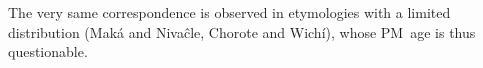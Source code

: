 \begin{exe}
    \ex \gofirst
    \ex \goawayi
    \ex \arrive
    \ex \shout
    \ex \stinger
    \ex \cryao
    \ex \returnth
    \ex \burn
    \ex \food
    \ex \son
    \ex \daughter
    \ex \bleedv
    \ex \drinkn
    \ex \fatv
    \ex \flyv
    \ex \suncho
    \ex \welln
    \ex \drinkv
    \ex \jaguar
    \ex \treen
    \ex \water
    \ex \vulture
    \ex \truev
    \ex \testicle
    \ex \tail
    \ex \fall
    \ex \cactus \label{ao-cactus}
    \ex \arrowkaxe
    \ex \youngersis
    \ex \withstand
    \ex \killv
    \ex \snail
    \ex \pet
    \ex \nightmonkey
    \ex {} \label{ao-defecate}
    \ex \lightfire
    \ex \sleep
    \ex \goimp
    \ex \powder \label{ao-powder}
    \ex \father
    \ex \rope
    \ex \pathn
    \ex \cavy
    \ex \snore
    \ex \mucus
    \ex \bitter \label{ao-bitter}
    \ex \lip
    \ex \shuck
    \ex \jabiru
    \ex \quick
    \ex \up
    \ex \leg
    \ex \fishwithhook
    \ex \soul \label{ao-soul}
    \ex \vein
    \ex \spank
    \ex \wildcat
    \ex \acquainted
    \ex \sprout
    \ex \dinlaw
    \ex \eyelash \label{ao-eyelash}
    \ex \shoot
    \ex \carrysh \label{ao-carrysh}
    \ex \woodpecker
    \ex \chaja
    \ex \tired
    \ex \badmood
    \ex \rhea \label{ao-rhea}
    \ex \butterfly
    \ex \bat \label{ao-bat}
    \ex \straw
    \ex \rat \label{ao-rat}
    \ex \wildhoney
    \ex \mistolf
    \ex \mistolt
    \ex \hurt
    \ex \chaguara
    \ex \argentineboa \label{ao-argentineboa}
    \ex \wildbean \label{ao-wildbean}
    \ex \waspaniti
    \ex \stepv
    \ex \wildpepper
    \ex \skin
    \ex \teach \label{ao-teach}
    \ex \firei
    \ex \doveula
\end{exe}

The very same correspondence is observed in etymologies with a limited distribution (Maká and Nivaĉle, Chorote and Wichí), whose PM~age is thus questionable.

\begin{exe}
    \ex \pronominal \label{ao-pronominal}
    \ex \wordamet
    \ex \spin
    \ex \jar
    \ex \spillmn
    \ex \pocote
    \ex \tobacco
    \ex \ocelot
    \ex \redv
    \ex \torn
    \ex \grandchild
    \ex \feel
    \ex \willow
    \ex \two
    \ex \frog
    \ex \gutscw
    \ex \cicada
    \ex \siyaj
    \ex \durmili
    \ex \chachalaca
    \ex \toad
    \ex \soundv
    \ex \spillcw
    \ex \piranhamn
    \ex \skymn
    \ex \cloudmn
    \ex \fatalha
    \ex \ashamedcw
    \ex \orphanmn
    \ex \diecw
    \ex \mollef
\end{exe}


